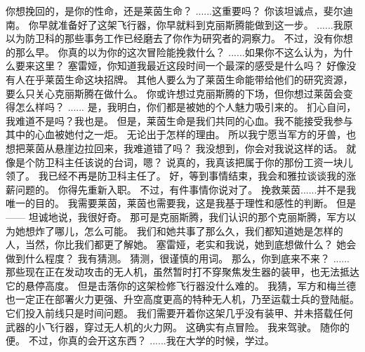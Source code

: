 \documentclass[openany]{book}
\begin{document}
\begin{dialogue}
     你想挽回的，是你的性命，还是莱茵生命？
     ......这重要吗？
     你该坦诚点，斐尔迪南。
     你早就准备好了这架飞行器，你早就料到克丽斯腾能做到这一步。
     ......我原以为防卫科的那些事务工作已经磨去了你作为研究者的洞察力。
     不过，没有你想的那么早。
     你真的以为你的这次冒险能挽救什么？
     ......如果你不这么认为，为什么要来这里？
     塞雷娅，你知道我最近这段时间一个最深的感受是什么吗？
     好像没有人在乎莱茵生命这块招牌。
     其他人要么为了莱茵生命能带给他们的研究资源，要么只关心克丽斯腾在做什么。
     你或许想过克丽斯腾的下场，但你想过莱茵会变得怎么样吗？
     ......
     是，我明白，你们都是被她的个人魅力吸引来的。
     扪心自问，我难道不是吗？我也是。
     但是，莱茵生命是我们共同的心血。我不能接受我参与其中的心血被她付之一炬。
     无论出于怎样的理由。
     所以我宁愿当军方的牙兽，也想把莱茵从悬崖边拉回来，我难道错了吗？
     我没想到，你会对我说这样的话。
     就像是个防卫科主任该说的台词，嗯？
     说真的，我真该把属于你的那份工资一块儿领了。
     我已经不再是防卫科主任了。
     好，等到事情结束，我会和雅拉谈谈我的涨薪问题的。
     你得先重新入职。
     不过，有件事情你说对了。
     挽救莱茵......并不是我唯一的目的。
     我需要莱茵，莱茵也需要我，这是我基于理性和感性的判断。
     但是——
     坦诚地说，我很好奇。
     那可是克丽斯腾，我们认识的那个克丽斯腾，军方以为她想炸了哪儿，怎么可能。
     我们和她共事了那么久，我们都知道她是怎样的人，当然，你比我们都更了解她。
     塞雷娅，老实和我说，她到底想做什么？
     她会做到什么程度？
     我有猜测。
     猜测，很谨慎的用词。
     那么，你到底来不来？
     ......
     那些现在正在发动攻击的无人机，虽然暂时打不穿聚焦发生器的装甲，也无法抵达它的悬停高度。
     但是击落你的这架检修飞行器没什么难的。
     我猜，军方和梅兰德也一定正在部署火力更强、升空高度更高的特种无人机，乃至运载士兵的登陆艇。它们投入前线只是时间问题。
     我们需要开着你这架几乎没有装甲、并未搭载任何武器的小飞行器，穿过无人机的火力网。
     这确实有点冒险。
     我来驾驶。
     随你的便。
     不过，你真的会开这东西？
     ......我在大学的时候，学过。
\end{dialogue}
\end{document}
